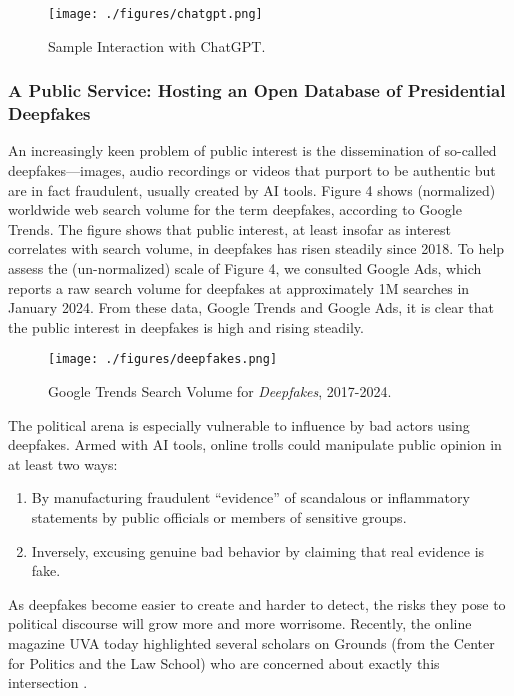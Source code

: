 \documentclass[12pt, oneside]{article}   	%
\begin{document}
\begin{figure}[htbp]
\begin{center}
\texttt{[image: ./figures/chatgpt.png]}
\caption{Sample Interaction with ChatGPT.}
\label{figure.chatgpt}
\end{center}
\end{figure}

\subsubsection{A Public Service: Hosting an Open Database of Presidential Deepfakes}\label{section.applications.easy.deepfakes}
An increasingly keen problem of public interest is the dissemination of so-called deepfakes—images, audio recordings or videos that purport to be authentic but are in fact fraudulent, usually created by AI tools.  Figure 4 shows (normalized) worldwide web search volume for the term deepfakes, according to Google Trends.  The figure shows that public interest, at least insofar as interest correlates with search volume, in deepfakes has risen steadily since 2018.  To help assess the (un-normalized) scale of Figure 4, we consulted Google Ads, which reports a raw search volume for deepfakes at approximately 1M searches in January 2024. From these data, Google Trends and Google Ads, it is clear that the public interest in deepfakes is high and rising steadily.


\begin{figure}[htbp]
\begin{center}
\texttt{[image: ./figures/deepfakes.png]}
\caption{Google Trends Search Volume for \emph{Deepfakes}, 2017-2024.}
\label{figure.deepfakes}
\end{center}
\end{figure}

The political arena is especially vulnerable to influence by bad actors using deepfakes.  Armed with AI tools, online trolls could manipulate public opinion in at least two ways:
\begin{enumerate}
\item By manufacturing fraudulent “evidence” of scandalous or inflammatory statements by public officials or members of sensitive groups.
\item Inversely, excusing genuine bad behavior by claiming that real evidence is fake.
\end{enumerate}
As deepfakes become easier to create and harder to detect, the risks they pose to political discourse will grow more and more worrisome.  Recently, the online magazine UVA today highlighted several scholars on Grounds (from the Center for Politics and the Law School) who are concerned about exactly this intersection \cite{mckenzie:2023}.
\end{document}
